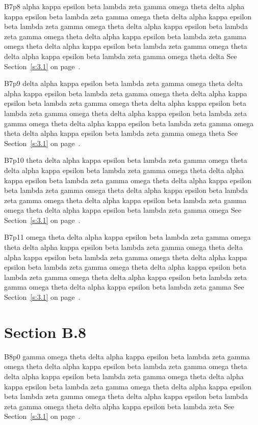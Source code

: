B7p8 alpha kappa epsilon beta lambda zeta gamma omega theta delta alpha kappa epsilon beta lambda zeta gamma omega theta delta alpha kappa epsilon beta lambda zeta gamma omega theta delta alpha kappa epsilon beta lambda zeta gamma omega theta delta alpha kappa epsilon beta lambda zeta gamma omega theta delta alpha kappa epsilon beta lambda zeta gamma omega theta delta alpha kappa epsilon beta lambda zeta gamma omega theta delta See Section~\ref{s:3.1} on page~\pageref{s:3.1}.

B7p9 delta alpha kappa epsilon beta lambda zeta gamma omega theta delta alpha kappa epsilon beta lambda zeta gamma omega theta delta alpha kappa epsilon beta lambda zeta gamma omega theta delta alpha kappa epsilon beta lambda zeta gamma omega theta delta alpha kappa epsilon beta lambda zeta gamma omega theta delta alpha kappa epsilon beta lambda zeta gamma omega theta delta alpha kappa epsilon beta lambda zeta gamma omega theta See Section~\ref{s:3.1} on page~\pageref{s:3.1}.

B7p10 theta delta alpha kappa epsilon beta lambda zeta gamma omega theta delta alpha kappa epsilon beta lambda zeta gamma omega theta delta alpha kappa epsilon beta lambda zeta gamma omega theta delta alpha kappa epsilon beta lambda zeta gamma omega theta delta alpha kappa epsilon beta lambda zeta gamma omega theta delta alpha kappa epsilon beta lambda zeta gamma omega theta delta alpha kappa epsilon beta lambda zeta gamma omega See Section~\ref{s:3.1} on page~\pageref{s:3.1}.

B7p11 omega theta delta alpha kappa epsilon beta lambda zeta gamma omega theta delta alpha kappa epsilon beta lambda zeta gamma omega theta delta alpha kappa epsilon beta lambda zeta gamma omega theta delta alpha kappa epsilon beta lambda zeta gamma omega theta delta alpha kappa epsilon beta lambda zeta gamma omega theta delta alpha kappa epsilon beta lambda zeta gamma omega theta delta alpha kappa epsilon beta lambda zeta gamma See Section~\ref{s:3.1} on page~\pageref{s:3.1}.

\section{Section B.8}\label{s:B.8}
B8p0 gamma omega theta delta alpha kappa epsilon beta lambda zeta gamma omega theta delta alpha kappa epsilon beta lambda zeta gamma omega theta delta alpha kappa epsilon beta lambda zeta gamma omega theta delta alpha kappa epsilon beta lambda zeta gamma omega theta delta alpha kappa epsilon beta lambda zeta gamma omega theta delta alpha kappa epsilon beta lambda zeta gamma omega theta delta alpha kappa epsilon beta lambda zeta See Section~\ref{s:3.1} on page~\pageref{s:3.1}.

